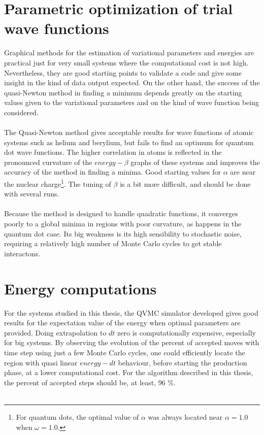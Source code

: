 \section{Parametric optimization of trial wave functions}

Graphical methods for the estimation of variational parameters and energies are practical just for very small systems where the computational cost is not high. Nevertheless, they are good starting points to validate a code and give some insight in the kind of data output expected. On the other hand, the success of the quasi-Newton method in finding a minimum depends greatly on the starting values given to the variational parameters and on the kind of wave function being considered.\\
\\
\noindent
The Quasi-Newton method gives acceptable results for wave functions of atomic systems such as helium and berylium, but fails to find an optimum for quantum dot wave functions. The higher correlation in atoms is reflected in the pronounced curvature of the $energy-\beta$ graphs of these systems and improves the accuracy of the method in finding a minima. Good starting values for $\alpha$ are near the nuclear charge\footnote{For quantum dots, the optimal value of $\alpha$ was always located near $\alpha=1.0$ when $\omega = 1.0$. }. The tuning of $\beta$ is a bit more difficult, and should be done with several runs. 
\\
\\
Because the method is designed to handle quadratic functions, it converges poorly to a global minima in regions with poor curvature, as happens in the quantum dot case. Its big weakness is its high sensibility to stochastic noise, requiring a relatively high number of Monte Carlo cycles to get stable interactons.\\

\section{Energy computations}

For the systems studied in this thesis, the QVMC simulator developed gives good results for the expectation value of the energy when optimal parameters are provided. Doing extrapolation to $dt$ zero is computationally expensive, especially for big systems. By observing the evolution of the percent of accepted moves with time step using just a few Monte Carlo cycles, one could efficiently locate the region with quasi linear $energy-dt$ behaviour, before starting the production phase, at a lower computational cost. For the algorithm described in this thesis, the percent of accepted steps should be, at least, 96 \%.\\
\\

